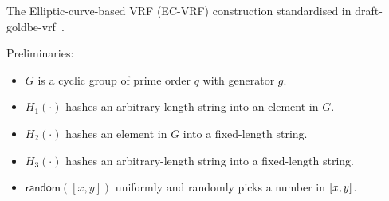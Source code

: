 \begin{algorithm}[]
    \caption{The Elliptic-curve-based VRF (EC-VRF) construction standardised in draft-goldbe-vrf~\cite{goldberg2017draft}.}\label{algo:standard-ecvrf}
    \SetAlgoLined\DontPrintSemicolon

    Preliminaries:
    \begin{itemize}
        \item $G$ is a cyclic group of prime order $q$ with generator $g$.
        \item $H_1(\cdot)$ hashes an arbitrary-length string into an element in $G$.
        \item $H_2(\cdot)$ hashes an element in $G$ into a fixed-length string.
        \item $H_3(\cdot)$ hashes an arbitrary-length string into a fixed-length string.
        \item $\mathsf{random}([x, y])$ uniformly and randomly picks a number in $\interval{x}{y}$.
    \end{itemize}




\end{algorithm}
